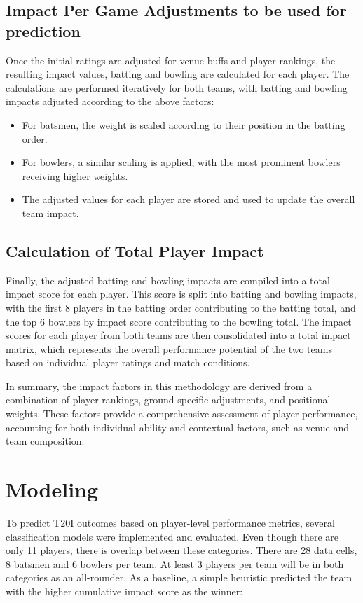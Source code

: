 \documentclass{article}[12pt]
\begin{document}
\subsection{Impact Per Game Adjustments to be used for prediction}
Once the initial ratings are adjusted for venue buffs and player rankings, the resulting impact values, batting and bowling are calculated for each player. The calculations are performed iteratively for both teams, with batting and bowling impacts adjusted according to the above factors:
\begin{itemize}
    \item For batsmen, the weight is scaled according to their position in the batting order.
    \item For bowlers, a similar scaling is applied, with the most prominent bowlers receiving higher weights.
    \item The adjusted values for each player are stored and used to update the overall team impact.
\end{itemize}

\subsection{Calculation of Total Player Impact}
Finally, the adjusted batting and bowling impacts are compiled into a total impact score for each player. This score is split into batting and bowling impacts, with the first 8 players in the batting order contributing to the batting total, and the top 6 bowlers by impact score contributing to the bowling total. The impact scores for each player from both teams are then consolidated into a total impact matrix, which represents the overall performance potential of the two teams based on individual player ratings and match conditions.

In summary, the impact factors in this methodology are derived from a combination of player rankings, ground-specific adjustments, and positional weights. These factors provide a comprehensive assessment of player performance, accounting for both individual ability and contextual factors, such as venue and team composition.

\section{Modeling} \label{sec:model}

To predict T20I outcomes based on player-level performance metrics, several classification models were implemented and evaluated. Even though there are only 11 players, there is overlap between these categories. There are 28 data cells, 8 batsmen and 6 bowlers per team. At least 3 players per team will be in both categories as an all-rounder. As a baseline, a simple heuristic predicted the team with the higher cumulative impact score as the winner:  
\end{document}

